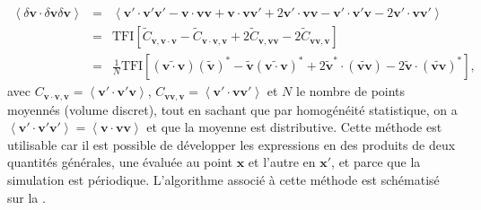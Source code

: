\begin{eqnarray}
    \left<\delta \boldsymbol{v} \cdot \delta \boldsymbol{v} \delta \boldsymbol{v}\right> &=& \left<\boldsymbol{v'} \cdot \boldsymbol{v'} \boldsymbol{v'} - \boldsymbol{v} \cdot \boldsymbol{v} \boldsymbol{v}  + \boldsymbol{v} \cdot \boldsymbol{v} \boldsymbol{v'} + 2 \boldsymbol{v'} \cdot \boldsymbol{v} \boldsymbol{v}- \boldsymbol{v'} \cdot \boldsymbol{v'} \boldsymbol{v} - 2 \boldsymbol{v'} \cdot \boldsymbol{v} \boldsymbol{v'}\right> \nonumber\\
&=&  \text{TFI} [\widetilde{C}_{\boldsymbol{v},\boldsymbol{v} \cdot \boldsymbol{v}} - \widetilde{C}_{\boldsymbol{v} \cdot \boldsymbol{v},  \boldsymbol{v}} + 2 \widetilde{C}_{\boldsymbol{v},\boldsymbol{v}\boldsymbol{v}}  - 2 \widetilde{C}_{\boldsymbol{v}\boldsymbol{v},\boldsymbol{v}} ] \quad \nonumber  \\
&=& \frac{1}{N}  \text{TFI} [   (\widetilde{ \boldsymbol{v} \cdot \boldsymbol{v}})(\boldsymbol{\widetilde{v}})^* - \boldsymbol{\widetilde{v}} (\widetilde{\boldsymbol{v} \cdot \boldsymbol{v}})^* +2\boldsymbol{\widetilde{v}}^* \cdot (\widetilde{\boldsymbol{v} \boldsymbol{v}}) -2\boldsymbol{\widetilde{v}}\cdot (\widetilde{\boldsymbol{v} \boldsymbol{v}})^* ], \quad
\end{eqnarray}
avec $C_{\boldsymbol{v} \cdot \boldsymbol{v},  \boldsymbol{v}} = \left< \boldsymbol{v'} \cdot \boldsymbol{v'} \boldsymbol{v}\right>$, $C_{\boldsymbol{v}\boldsymbol{v},\boldsymbol{v}} = \left< \boldsymbol{v'} \cdot \boldsymbol{v} \boldsymbol{v'} \right>$ et $N$ le nombre de points moyennés (volume discret), tout en sachant que par homogénéité statistique, on a $\left< \boldsymbol{v'} \cdot \boldsymbol{v'} \boldsymbol{v'}\right> = \left< \boldsymbol{v} \cdot \boldsymbol{v} \boldsymbol{v}\right>$ et que la moyenne est distributive. Cette méthode est utilisable car il est possible de développer les expressions en des produits de deux quantités générales, une évaluée au point $\boldsymbol{x}$ et l'autre en $\boldsymbol{x'}$, et parce que la simulation est périodique. L'algorithme associé à cette méthode est schématisé sur la .
